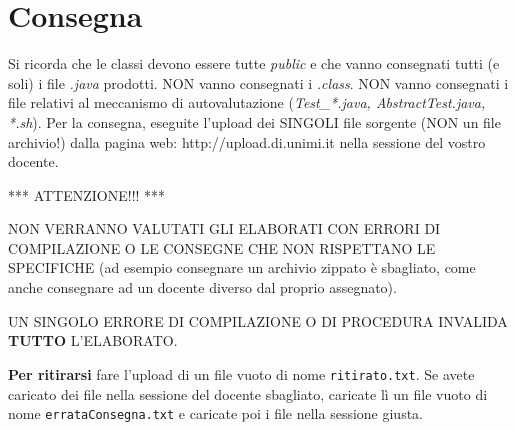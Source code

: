 \documentclass[a4paper,12pt]{article}
\begin{document}
\hrulefill

\section{Consegna}
Si ricorda che le classi devono essere tutte \textit{public} e che vanno 
consegnati tutti (e soli) i file \textit{.java} prodotti.
NON vanno consegnati i \textit{.class}.
NON vanno consegnati i file relativi al meccanismo di autovalutazione 
(\textit{Test\_*.java, AbstractTest.java, *.sh}).
Per la consegna, eseguite l'upload dei SINGOLI file sorgente (NON un file archivio!) dalla pagina web: http://upload.di.unimi.it
nella sessione del vostro docente.

\hrulefill

\begin{center}*** ATTENZIONE!!! ***\end{center}

NON VERRANNO VALUTATI GLI ELABORATI CON ERRORI DI COMPILAZIONE O 
LE CONSEGNE CHE NON RISPETTANO LE SPECIFICHE (ad esempio consegnare un 
archivio zippato è sbagliato, come anche consegnare ad un docente diverso dal 
proprio assegnato).

UN SINGOLO ERRORE DI COMPILAZIONE O DI PROCEDURA INVALIDA 
\textbf{TUTTO} 
L'ELABORATO.
\medskip

\hrulefill

{\bf Per ritirarsi}
fare l'upload di un file vuoto di nome  \texttt{ritirato.txt}. Se avete caricato 
dei file nella sessione del docente sbagliato, caricate lì un file vuoto di 
nome  \texttt{errataConsegna.txt} e caricate poi i file nella sessione giusta. 

\hrulefill

\end{document}
